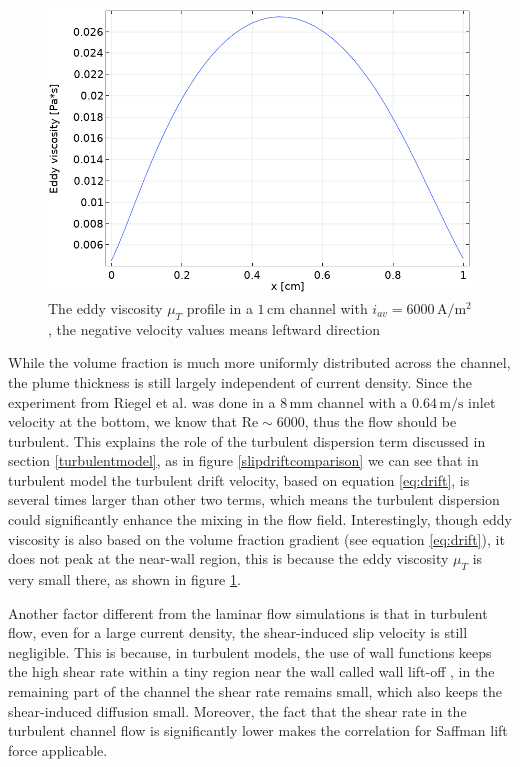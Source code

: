   \begin{figure}
     \centering
     \includegraphics[scale = 0.5]{eddyviscosity.png}
     \caption{The eddy viscosity $\mu_T$ profile in a $1 \, \mathrm{cm}$ channel with $i_{av}=6000 \, \mathrm{A/m^2}$, the negative velocity values means leftward direction}
     \label{eddyviscosity}
 \end{figure}
While the volume fraction is much more uniformly distributed across the channel, the plume thickness is still largely independent of current density. Since the experiment from Riegel et al. \cite{riegel1998role} was done in a $8 \, \mathrm{mm}$ channel with a $0.64 \, \mathrm{m/s}$ inlet velocity at the bottom, we know that $ \mathrm{Re} \sim 6000$, thus the flow should be turbulent. This explains the role of the turbulent dispersion term discussed in section \ref{turbulentmodel}, as in figure \ref{slipdriftcomparison} we can see that in turbulent model the turbulent drift velocity, based on equation \ref{eq:drift}, is several times larger than other two terms, which means the turbulent dispersion could significantly enhance the mixing in the flow field. Interestingly, though eddy viscosity is also based on the volume fraction gradient (see equation \ref{eq:drift}), it does not peak at the near-wall region, this is because the eddy viscosity $\mu_T$ is very small there, as shown in figure \ref{eddyviscosity}.

Another factor different from the laminar flow simulations is that in turbulent flow, even for a large current density, the shear-induced slip velocity is still negligible. This is because, in turbulent models, the use of wall functions keeps the high shear rate within a tiny region near the wall called wall lift-off \cite{COMSOL2016}, in the remaining part of the channel the shear rate remains small, which also keeps the shear-induced diffusion small. Moreover, the fact that the shear rate in the turbulent channel flow is significantly lower makes the correlation for Saffman lift force applicable.


